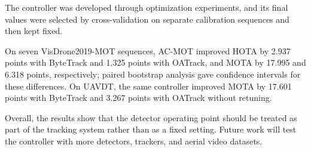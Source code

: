 \documentclass[journal]{new-aiaa}
\begin{document}
The controller was developed through optimization experiments, and its final
values were selected by cross-validation on separate calibration sequences and
then kept fixed.

On seven VisDrone2019-MOT sequences, AC-MOT improved HOTA by 2.937 points with
ByteTrack and 1.325 points with OATrack, and MOTA by 17.995 and 6.318 points,
respectively; paired bootstrap analysis gave confidence intervals for these
differences. On UAVDT, the same controller improved MOTA by 17.601 points with
ByteTrack and 3.267 points with OATrack without retuning.

Overall, the results show that the detector operating point should be treated
as part of the tracking system rather than as a fixed setting. Future work
will test the controller with more detectors, trackers, and aerial video
datasets.
\end{document}

